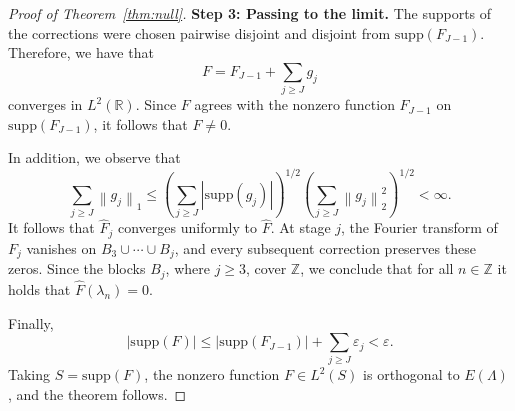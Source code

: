 \documentclass[10pt,a4paper]{amsart}
\def\R{{\mathbb R}}
\def\Z{{\mathbb Z}}
\newcommand{\norm}[1]{\left\lVert #1 \right\rVert}
\newcommand{\supp}{{\mathrm{supp}}}
\begin{document}
\begin{proof}[Proof of Theorem~\ref{thm:null}]
\medskip
\noindent\textbf{Step 3: Passing to the limit.}
The supports of the corrections were chosen pairwise disjoint and
disjoint from \(\supp (F_{J-1})\). Therefore, we have that
\[
    F=F_{J-1}+\sum_{j\geq J}g_j
\]
converges in \(L^2(\R)\). Since \(F\) agrees with
the nonzero function \(F_{J-1}\) on \(\supp (F_{J-1})\), it follows that $F \neq 0$.

In addition, we observe that
\[
    \sum_{j\geq J}\norm{g_j}_1
    \leq
    \left(\sum_{j\geq J}|\supp (g_j)|\right)^{1/2}
    \left(\sum_{j\geq J}\norm{g_j}_2^2\right)^{1/2}
    <\infty.
\]
It follows that \(\widehat F_j\) converges uniformly to \(\widehat F\).
At stage \(j\), the Fourier transform of \(F_j\) vanishes on
\(B_3\cup\cdots\cup B_j\), and every subsequent correction preserves
these zeros. Since the blocks \(B_j\), where \(j\geq3\), cover \(\Z\), we
conclude that for all $n \in \Z$ it holds that $\widehat F(\lambda_n)=0$.

Finally,
\[
    |\supp (F)|
    \leq
    |\supp (F_{J-1})|+\sum_{j\geq J}\varepsilon_j
    <\varepsilon.
\]
Taking \(S=\supp (F)\), the nonzero function \(F\in L^2(S)\) is
orthogonal to \(E(\Lambda)\), and the theorem follows.
\end{proof}
\end{document}
